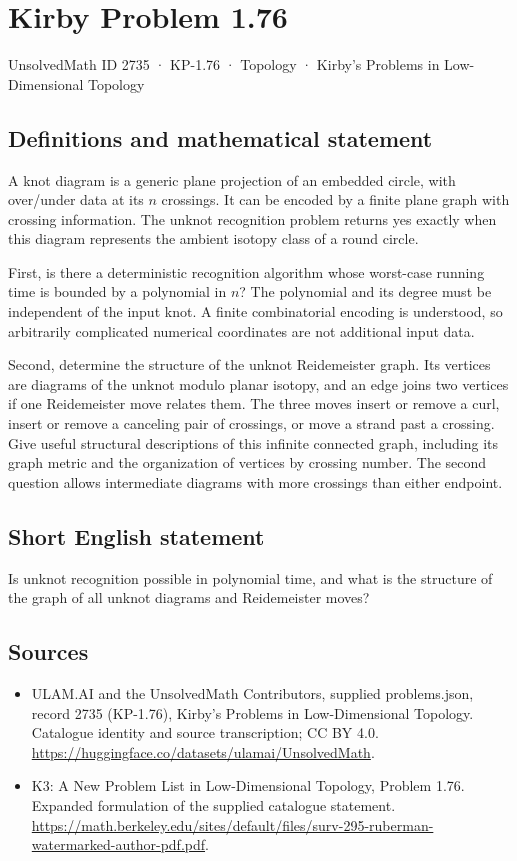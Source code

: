 \documentclass[11pt,a4paper]{article}
\begin{document}
\section*{Kirby Problem 1.76}\label{2735}
{\small UnsolvedMath ID 2735 · KP-1.76 · Topology · Kirby's Problems in Low-Dimensional Topology}
\subsection{Definitions and mathematical statement}
A knot diagram is a generic plane projection of an embedded circle, with
over/under data at its $n$ crossings. It can be encoded by a finite plane graph
with crossing information. The unknot recognition problem returns yes exactly
when this diagram represents the ambient isotopy class of a round circle.

First, is there a deterministic recognition algorithm whose worst-case running
time is bounded by a polynomial in $n$? The polynomial and its degree must be
independent of the input knot. A finite combinatorial encoding is understood,
so arbitrarily complicated numerical coordinates are not additional input data.

Second, determine the structure of the unknot Reidemeister graph. Its vertices
are diagrams of the unknot modulo planar isotopy, and an edge joins two vertices
if one Reidemeister move relates them. The three moves insert or remove a curl,
insert or remove a canceling pair of crossings, or move a strand past a crossing.
Give useful structural descriptions of this infinite connected graph, including
its graph metric and the organization of vertices by crossing number.
The second question allows intermediate diagrams with more crossings than
either endpoint.
\subsection{Short English statement}
Is unknot recognition possible in polynomial time, and what is the structure of the graph of all unknot diagrams and Reidemeister moves?
\subsection{Sources}
\begin{itemize}
\item[S1] ULAM.AI and the UnsolvedMath Contributors, supplied problems.json, record 2735 (KP-1.76), Kirby's Problems in Low-Dimensional Topology. Catalogue identity and source transcription; CC BY 4.0.
\url{https://huggingface.co/datasets/ulamai/UnsolvedMath}.
\item[S2] K3: A New Problem List in Low-Dimensional Topology, Problem 1.76. Expanded formulation of the supplied catalogue statement.
\url{https://math.berkeley.edu/sites/default/files/surv-295-ruberman-watermarked-author-pdf.pdf}.
\end{itemize}
\end{document}
